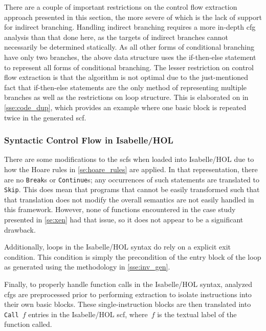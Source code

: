 There are a couple of important restrictions on the control flow extraction approach
presented in this section,
the more severe of which is the lack of support for indirect branching.
Handling indirect branching requires a more in-depth \ac{cfg} analysis
than that done here,
as the targets of indirect branches cannot necessarily be determined statically.
As all other forms of conditional branching have only two branches,
the above data structure uses the if-then-else statement to represent all forms of
conditional branching.
The lesser restriction on control flow extraction is that the algorithm is not optimal
due to the just-mentioned fact that if-then-else statements
are the only method of representing multiple branches
as well as the restrictions on loop structure.
This is elaborated on in \cref{sse:code_dup},
which provides an example where one basic block is repeated twice
in the generated \ac{scf}.

\subsubsection{Syntactic Control Flow in Isabelle/HOL}
There are some modifications to the \acp{scf} when loaded into Isabelle/HOL%
due to how the Hoare rules in \cref{se:hoare_rules} are applied.
In that representation, there are no \texttt{Break}s or \texttt{Continue}s;
any occurrences of such statements are translated to \texttt{Skip}.
This does mean that programs that cannot be easily transformed
such that that translation does not modify the overall semantics
are not easily handled in this framework.
However, none of functions encountered in the case study presented in \cref{se:xen}
had that issue, so it does not appear to be a significant drawback.

Additionally, loops in the Isabelle/HOL syntax do rely on a explicit exit condition.%
This condition is simply the precondition of the entry block of the loop
as generated using the methodology in \cref{sse:inv_gen}.

Finally, to properly handle function calls in the Isabelle/HOL syntax,
analyzed \acp{cfg} are preprocessed prior to performing extraction
to isolate  instructions into their own basic blocks.%
These single-instruction blocks are then translated into \texttt{Call}~$f$ entries
in the Isabelle/HOL \ac{scf}, where~$f$ is the textual label of the function called.

